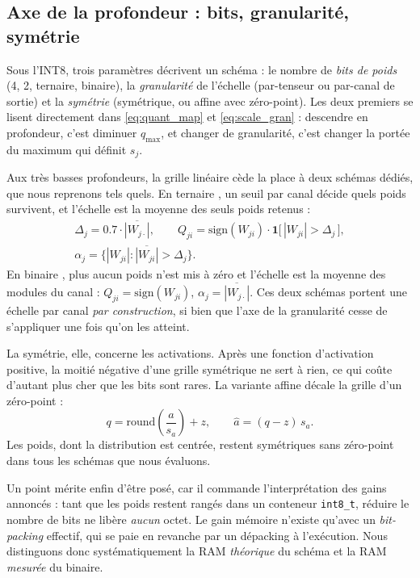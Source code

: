 \subsection{Axe de la profondeur : bits, granularité, symétrie}

Sous l'INT8, trois paramètres décrivent un schéma : le nombre de \emph{bits de poids} (4, 2, ternaire,
binaire), la \emph{granularité} de l'échelle (par-tenseur ou par-canal de sortie) et la \emph{symétrie}
(symétrique, ou affine avec zéro-point). Les deux premiers se lisent directement dans
\eqref{eq:quant_map} et \eqref{eq:scale_gran} : descendre en profondeur, c'est diminuer $q_{\max}$, et
changer de granularité, c'est changer la portée du maximum qui définit $s_j$.

Aux très basses profondeurs, la grille linéaire cède la place à deux schémas dédiés, que nous reprenons
tels quels. En ternaire \cite{Li2016TWN}, un seuil par canal décide quels poids survivent, et l'échelle
est la moyenne des seuls poids retenus :
\begin{equation}
\label{eq:twn}
\begin{gathered}
\Delta_j = \num{0.7} \cdot \overline{|W_{j\cdot}|},
\qquad
Q_{ji} = \mathrm{sign}(W_{ji}) \cdot \mathbf{1}\bigl[\,|W_{ji}| > \Delta_j\,\bigr], \\[2pt]
\alpha_j = \overline{\bigl\{ |W_{ji}| : |W_{ji}| > \Delta_j \bigr\}} .
\end{gathered}
\end{equation}
En binaire \cite{Rastegari2016XNOR}, plus aucun poids n'est mis à zéro et l'échelle est la moyenne des
modules du canal : $Q_{ji} = \mathrm{sign}(W_{ji})$, $\alpha_j = \overline{|W_{j\cdot}|}$. Ces deux
schémas portent une échelle par canal \emph{par construction}, si bien que l'axe de la granularité cesse
de s'appliquer une fois qu'on les atteint.

La symétrie, elle, concerne les activations. Après une fonction d'activation positive, la moitié
négative d'une grille symétrique ne sert à rien, ce qui coûte d'autant plus cher que les bits sont
rares. La variante affine décale la grille d'un zéro-point :
\begin{equation}
\label{eq:affine_act}
q = \mathrm{round}\!\left(\frac{a}{s_a}\right) + z,
\qquad
\widehat{a} = (q - z)\, s_a .
\end{equation}
Les poids, dont la distribution est centrée, restent symétriques sans zéro-point dans tous les schémas
que nous évaluons.

Un point mérite enfin d'être posé, car il commande
l'interprétation des gains annoncés : tant que les poids restent rangés dans un conteneur
\texttt{int8\_t}, réduire le nombre de bits ne libère \emph{aucun} octet. Le gain mémoire n'existe qu'avec
un \emph{bit-packing} effectif, qui se paie en revanche par un dépacking à l'exécution. Nous distinguons
donc systématiquement la RAM \emph{théorique} du schéma et la RAM \emph{mesurée} du binaire.

